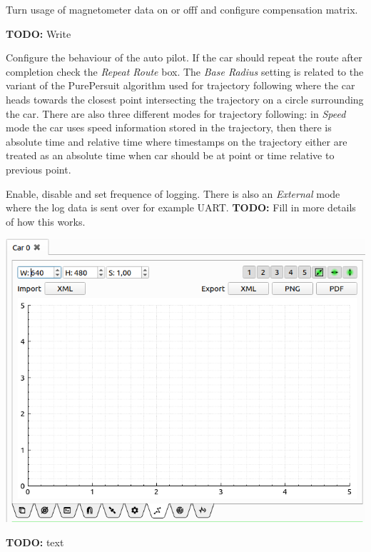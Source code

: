 \documentclass[12pt]{article} %
\newcommand{\todo}[1]{{\color{red} \textbf{TODO:} #1}}
\begin{document}
\begin{minipage}{0.7\textwidth} %
 Turn usage of magnetometer data on or
offf and configure compensation matrix.

 \todo{ Write }

 Configure the behaviour of the auto
pilot. If the car should repeat the route after completion check the
{\em Repeat Route} box. The {\em Base Radius} setting is related to
the variant of the PurePersuit algorithm used for trajectory following
where the car heads towards the closest point intersecting the
trajectory on a circle surrounding the car. There are also three
different modes for trajectory following: in {\em Speed} mode the car
uses speed information stored in the trajectory, then there is
absolute time and relative time where timestamps on the trajectory
either are treated as an absolute time when car should be at point or
time relative to previous point.

 Enable, disable and set frequence of logging. There is
also an {\em External} mode where the log data is sent over for example UART.
\todo{Fill in more details of how this works}.
\end{minipage}
\noindent\begin{minipage}{0.6\textwidth}
  \noindent \includegraphics[width=\textwidth]{./screens/Car_experiment_plot.png}
\end{minipage}
\begin{minipage}{0.5\textwidth} %
  \todo{text}
\end{minipage}
\end{document}
